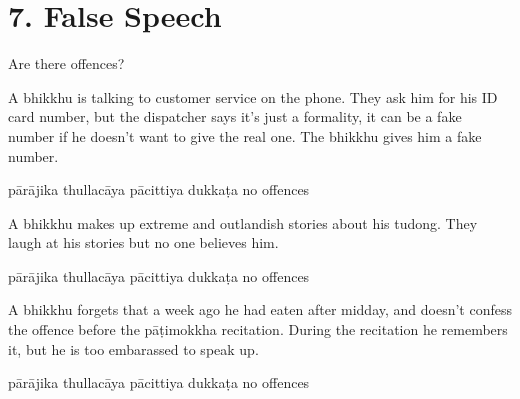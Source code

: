 \chapter{7. False Speech}
\renewcommand*{\theChapterTitle}{7. False Speech}

\begin{exam}{\autoExamName}

\begin{problem*}

Are there offences?

\begin{parts}

\item A bhikkhu is talking to customer service on the phone. They ask him for
  his ID card number, but the dispatcher says it's just a formality, it can be a
  fake number if he doesn't want to give the real one. The bhikkhu gives him a
  fake number.

  \bigskip

  \begin{answers}{5}
    \bChoices
     pārājika\eAns
     thullacāya\eAns
     pācittiya\eAns
     dukkaṭa\eAns
     no offences\eAns
    \eChoices
  \end{answers}

  \bigskip

\item A bhikkhu makes up extreme and outlandish stories about his tudong. They
  laugh at his stories but no one believes him.

  \bigskip

  \begin{answers}{5}
    \bChoices
     pārājika\eAns
     thullacāya\eAns
     pācittiya\eAns
     dukkaṭa\eAns
     no offences\eAns
    \eChoices
  \end{answers}

  \bigskip

\item A bhikkhu forgets that a week ago he had eaten after midday, and doesn't
  confess the offence before the pāṭimokkha recitation. During the recitation he
  remembers it, but he is too embarassed to speak up.

  \bigskip

  \begin{answers}{5}
    \bChoices
     pārājika\eAns
     thullacāya\eAns
     pācittiya\eAns
     dukkaṭa\eAns
     no offences\eAns
    \eChoices
  \end{answers}


\end{parts}
\end{problem*}
\end{exam}
